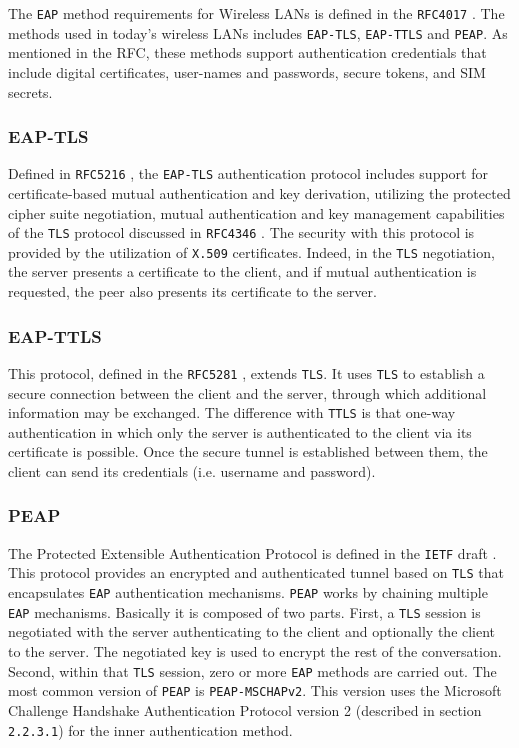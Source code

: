 The \texttt{EAP} method requirements for Wireless LANs is defined in the \texttt{RFC4017} \cite{rfc4017}. The methods used in today's wireless LANs includes \texttt{EAP-TLS}, \texttt{EAP-TTLS} and \texttt{PEAP}. As mentioned in the RFC, these methods support authentication credentials that include digital certificates, user-names and passwords, secure tokens, and SIM secrets.

\subsubsection{EAP-TLS}
Defined in \texttt{RFC5216} \cite{rfc5216}, the \texttt{EAP-TLS} authentication protocol includes support for certificate-based mutual authentication and key derivation, utilizing the protected cipher suite negotiation, mutual authentication and key management capabilities of the \texttt{TLS} protocol discussed in \texttt{RFC4346} \cite{rfc4346}. The security with this protocol is provided by the utilization of \texttt{X.509} certificates. Indeed, in the \texttt{TLS} negotiation, the server presents a certificate to the client, and if mutual authentication is requested, the peer also presents its certificate to the server.

\subsubsection{EAP-TTLS} 
This protocol, defined in the \texttt{RFC5281} \cite{rfc5281}, extends \texttt{TLS}. It uses \texttt{TLS} to establish a secure connection between the client and the server, through which additional information may be exchanged. The difference with \texttt{TTLS} is that one-way authentication in which only the server is authenticated to the client via its certificate is possible. Once the secure tunnel is established between them, the client can send its credentials (i.e. username and password).

\subsubsection{PEAP} 
The Protected Extensible Authentication Protocol is defined in the \texttt{IETF} draft \cite{peap-draft}. This protocol provides an encrypted and authenticated tunnel based on \texttt{TLS} that encapsulates \texttt{EAP} authentication mechanisms. \texttt{PEAP} works by chaining multiple \texttt{EAP} mechanisms. Basically it is composed of two parts. First, a \texttt{TLS} session is negotiated with the server authenticating to the client and optionally the client to the server. The negotiated key is used to encrypt the rest of the conversation. Second, within that \texttt{TLS} session, zero or more \texttt{EAP} methods are carried out.
The most common version of \texttt{PEAP} is \texttt{PEAP-MSCHAPv2}. This version uses the Microsoft Challenge Handshake Authentication Protocol version 2 (described in section \texttt{2.2.3.1}) for the inner authentication method.



